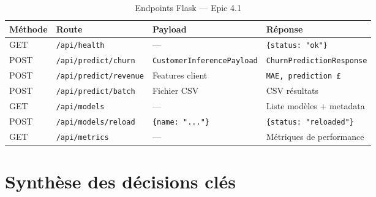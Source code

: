 \documentclass[11pt,a4paper]{article}
\begin{document}
\begin{table}[H]
\centering\small
\caption{Endpoints Flask — Epic 4.1}
\begin{tabular}{L{2cm} L{4.5cm} L{3cm} L{4cm}}
\toprule
{}
\textbf{Méthode} & \textbf{Route} & \textbf{Payload} & \textbf{Réponse} \\
\midrule
GET  & \texttt{/api/health} & — & \texttt{\{status: "ok"\}} \\
POST & \texttt{/api/predict/churn} & \texttt{CustomerInferencePayload} & \texttt{ChurnPredictionResponse} \\
POST & \texttt{/api/predict/revenue} & Features client & \texttt{MAE, prediction £} \\
POST & \texttt{/api/predict/batch} & Fichier CSV & CSV résultats \\
GET  & \texttt{/api/models} & — & Liste modèles + metadata \\
POST & \texttt{/api/models/reload} & \texttt{\{name: "..."\}} & \texttt{\{status: "reloaded"\}} \\
GET  & \texttt{/api/metrics} & — & Métriques de performance \\
\bottomrule
\end{tabular}
\end{table}

\section{Synthèse des décisions clés}
\end{document}
